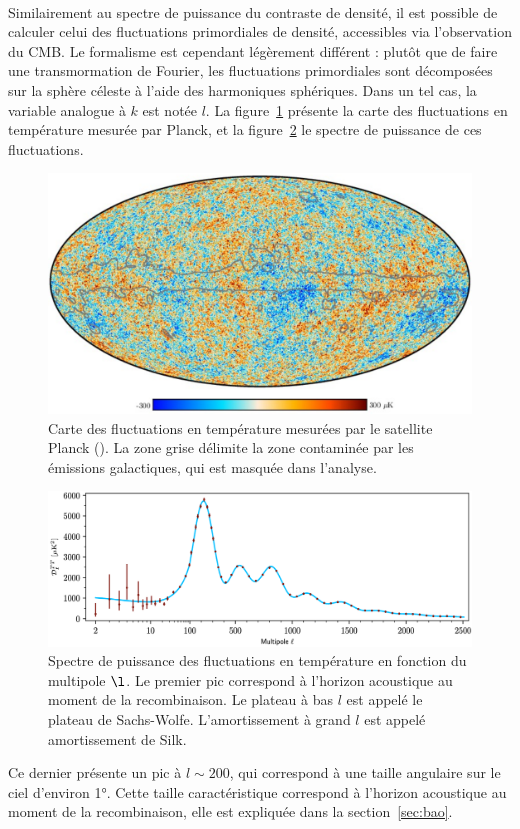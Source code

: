 \documentclass[11pt, twoside, a4paper, openright]{report}
\begin{document}
\paragraph{}
Similairement au spectre de puissance du contraste de densité, il est possible de calculer celui des fluctuations primordiales de densité, accessibles via l'observation du CMB. Le formalisme est cependant légèrement différent : plutôt que de faire une transmormation de Fourier, les fluctuations primordiales sont décomposées sur la sphère céleste à l'aide des harmoniques sphériques. Dans un tel cas, la variable analogue à $k$ est notée $l$. La figure~\ref{fig:carte_cmb} présente la carte des fluctuations en température mesurée par Planck, et la figure~\ref{fig:spectre_cmb} le spectre de puissance de ces fluctuations.
\begin{figure}
  \centering
  \includegraphics[scale=0.3]{carte_cmb}
  \caption{Carte des fluctuations en température mesurées par le satellite Planck (\cite{Aghanim2019}). La zone grise délimite la zone contaminée par les émissions galactiques, qui est masquée dans l'analyse.}
  \label{fig:carte_cmb}
\end{figure}
\begin{figure}
  \centering
  \includegraphics[scale=0.4]{spectre_cmb}
  \caption{Spectre de puissance des fluctuations en température en fonction du multipole $\l$. Le premier pic correspond à l'horizon acoustique au moment de la recombinaison. Le plateau à bas $l$ est appelé le plateau de Sachs-Wolfe. L'amortissement à grand $l$ est appelé amortissement de Silk.}
  \label{fig:spectre_cmb}
\end{figure}
Ce dernier présente un pic à $l \sim 200$, qui correspond à une taille angulaire sur le ciel d'environ \ang{1}. Cette taille caractéristique correspond à l'horizon acoustique au moment de la recombinaison, elle est expliquée dans la section~\ref{sec:bao}.
\end{document}
